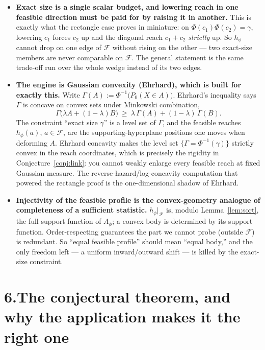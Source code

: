\documentclass[12pt]{article}
\theoremstyle{definition}
\theoremstyle{remark}
\newcommand{\Feas}{\mathcal F}
\begin{document}
\begin{itemize}[leftmargin=1.4em]
\item \textbf{Exact size is a single scalar budget, and lowering reach in one feasible direction must be paid for by raising it in another.} This is exactly what the rectangle case proves in miniature: on $\Phi(c_1)\Phi(c_2)=\gamma$, lowering $c_1$ forces $c_2$ up and the diagonal reach $c_1+c_2$ \emph{strictly} up. So $h_\phi$ cannot drop on one edge of $\Feas$ without rising on the other --- two exact-size members are never comparable on $\Feas$. The general statement is the same trade-off run over the whole wedge instead of its two edges.

\item \textbf{The engine is Gaussian convexity (Ehrhard), which is built for exactly this.} Write $\Gamma(A):=\Phi^{-1}\!\big(P_0(X\in A)\big)$. Ehrhard's inequality says $\Gamma$ is concave on convex sets under Minkowski combination,
\[
\Gamma\big(\lambda A+(1-\lambda)B\big)\ \ge\ \lambda\,\Gamma(A)+(1-\lambda)\,\Gamma(B).
\]
The constraint ``exact size $\gamma$'' is a level set of $\Gamma$, and the feasible reaches $h_\phi(a)$, $a\in\Feas$, are the supporting-hyperplane positions one moves when deforming $A$. Ehrhard concavity makes the level set $\{\Gamma=\Phi^{-1}(\gamma)\}$ strictly convex in the reach coordinates, which is precisely the rigidity in Conjecture~\ref{conj:link}: you cannot weakly enlarge every feasible reach at fixed Gaussian measure. The reverse-hazard/log-concavity computation that powered the rectangle proof is the one-dimensional shadow of Ehrhard.

\item \textbf{Injectivity of the feasible profile is the convex-geometry analogue of completeness of a sufficient statistic.} $h_\phi|_\Feas$ is, modulo Lemma~\ref{lem:sort}, the full support function of $A_\phi$; a convex body is determined by its support function. Order-respecting guarantees the part we cannot probe (outside $\Feas$) is redundant. So ``equal feasible profile'' should mean ``equal body,'' and the only freedom left --- a uniform inward/outward shift --- is killed by the exact-size constraint.
\end{itemize}

\section*{6.\quad The conjectural theorem, and why the application makes it the right one}
\end{document}
